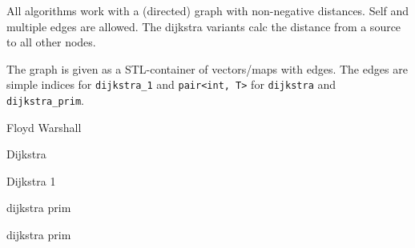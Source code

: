 
All algorithms work with a (directed) graph with non-negative distances.
Self and multiple edges are allowed. The dijkstra variants calc the
distance from a source to all other nodes.

The graph is given as a STL-container of vectors/maps with edges. The edges
are simple indices for {\tt dijkstra\_1} and {\tt pair<int, T>} for
{\tt dijkstra} and {\tt dijkstra\_prim}.

\begin{algorithm}{Floyd Warshall}
\end{algorithm}

\begin{algorithm}{Dijkstra}
\end{algorithm}

\begin{algorithm}{Dijkstra 1}
\end{algorithm}

\begin{algorithm}{dijkstra prim}
\end{algorithm}

\begin{algorithm}{dijkstra prim}
\end{algorithm}
